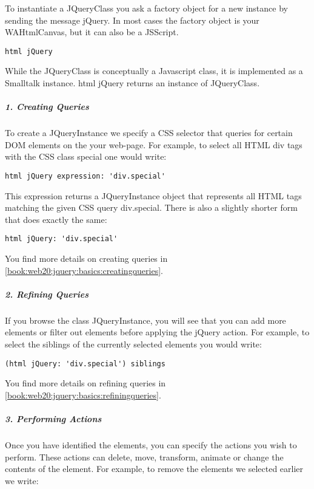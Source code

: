 \documentclass[a4paper,10pt,twoside]{book}
\newcommand{\ct}[1]{{\small\ttfamily\textup{#1}}}
\begin{document}
To instantiate a \ct{JQueryClass} you ask a factory object for a new instance by sending the message \ct{jQuery}. In most cases the factory object is your \ct{WAHtmlCanvas}, but it can also be a \ct{JSScript}.

\begin{lstlisting}
html jQuery
\end{lstlisting}

While the \ct{JQueryClass} is conceptually a Javascript class, it is implemented as a Smalltalk instance. \ct{html jQuery} returns an instance of  \ct{JQueryClass}.

\subparagraph*{ 1. Creating Queries}
\label{book:web20:jquery:basics:47256061}
To create a \ct{JQueryInstance} we specify a CSS selector that queries for certain DOM elements on the your web-page. For example, to select all HTML div tags with the CSS class \ct{special} one would write:

\begin{lstlisting}
html jQuery expression: 'div.special'
\end{lstlisting}

This expression returns a \ct{JQueryInstance} object that represents all HTML tags matching the given CSS query \ct{div.special}. There is also a slightly shorter form that does exactly the same:

\begin{lstlisting}
html jQuery: 'div.special'
\end{lstlisting}

You find more details on creating queries in \autoref{book:web20:jquery:basics:creatingqueries}.

\subparagraph*{ 2. Refining Queries}
\label{book:web20:jquery:basics:249614999}
If you browse the class \ct{JQueryInstance}, you will see that you can add more elements or filter out elements before applying the jQuery action. For example, to select the siblings of the currently selected elements you would write:

\begin{lstlisting}
(html jQuery: 'div.special') siblings
\end{lstlisting}

You find more details on refining queries in \autoref{book:web20:jquery:basics:refiningqueries}.

\subparagraph*{ 3. Performing Actions}
\label{book:web20:jquery:basics:82268626}
Once you have identified the elements, you can specify the actions you wish to perform. These actions can delete, move, transform, animate or change the contents of the element. For example, to remove the elements we selected earlier we write:
\end{document}

